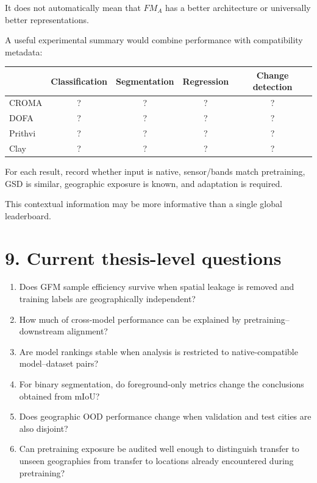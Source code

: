 \documentclass[11pt,a4paper]{article}
\begin{document}
It does not automatically mean that \(FM_A\) has a better architecture or universally better
representations.

A useful experimental summary would combine performance with compatibility metadata:

\begin{center}
\begin{tabular}{lcccc}
\toprule
 & Classification & Segmentation & Regression & Change detection \\
\midrule
CROMA  & ? & ? & ? & ? \\
DOFA   & ? & ? & ? & ? \\
Prithvi& ? & ? & ? & ? \\
Clay   & ? & ? & ? & ? \\
\bottomrule
\end{tabular}
\end{center}

For each result, record whether input is native, sensor/bands match pretraining, GSD is similar,
geographic exposure is known, and adaptation is required.

This contextual information may be more informative than a single global leaderboard.

\section{9. Current thesis-level questions}

\begin{enumerate}
    \item Does GFM sample efficiency survive when spatial leakage is removed and training labels are
    geographically independent?

    \item How much of cross-model performance can be explained by pretraining--downstream alignment?

    \item Are model rankings stable when analysis is restricted to native-compatible model--dataset pairs?

    \item For binary segmentation, do foreground-only metrics change the conclusions obtained from mIoU?

    \item Does geographic OOD performance change when validation and test cities are also disjoint?

    \item Can pretraining exposure be audited well enough to distinguish transfer to unseen geographies
    from transfer to locations already encountered during pretraining?
\end{enumerate}
\end{document}
